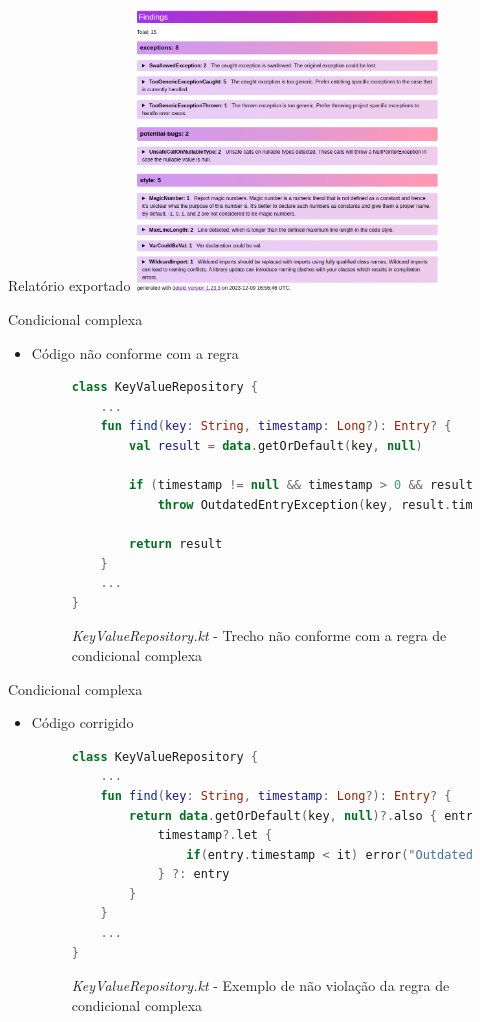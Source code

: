 \documentclass[brazilian]{beamer}
\begin{document}
\begin{frame}{Relatório exportado}
    \centering
    \includegraphics[height=7.5cm]{report_findings}
\end{frame}

\begin{frame}[fragile]{Condicional complexa}
    \begin{itemize}
        \item Código não conforme com a regra
        \begin{figure}[H]
            \centering
            \begin{lstlisting}[language=Kotlin]
class KeyValueRepository {
    ...
    fun find(key: String, timestamp: Long?): Entry? {
        val result = data.getOrDefault(key, null)

        if (timestamp != null && timestamp > 0 && result != null && result.timestamp < timestamp)
            throw OutdatedEntryException(key, result.timestamp)

        return result
    }
    ...
}
            \end{lstlisting}
            \caption{\textit{KeyValueRepository.kt} - Trecho não conforme com a regra de condicional complexa}
            \label{fig:detekt_complex_condition_before_example}
        \end{figure}
    \end{itemize}
\end{frame}

\begin{frame}[fragile]{Condicional complexa}
    \begin{itemize}
        \item Código corrigido
        \begin{figure}[H]
            \centering
            \begin{lstlisting}[language=Kotlin]
class KeyValueRepository {
    ...
    fun find(key: String, timestamp: Long?): Entry? {
        return data.getOrDefault(key, null)?.also { entry ->
            timestamp?.let {
                if(entry.timestamp < it) error("Outdated entry found!")
            } ?: entry
        }
    }
    ...
}
            \end{lstlisting}
            \caption{\textit{KeyValueRepository.kt} - Exemplo de não violação da regra de condicional complexa}
            \label{fig:detekt_complex_condition_after_example}
        \end{figure}
    \end{itemize}
\end{frame}
\end{document}
